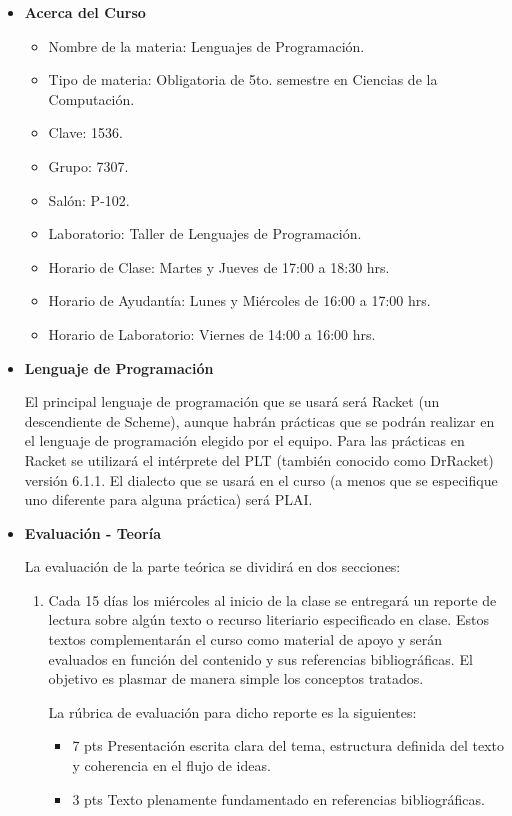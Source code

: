 \documentclass[10pt]{article}
\begin{document}
\begin{itemize}
\item \textbf{Acerca del Curso}
  
  \begin{itemize}
  \item  Nombre de la materia: Lenguajes de Programación.
  \item Tipo de materia: Obligatoria de 5to. semestre en Ciencias de
    la Computación.
  \item Clave: 1536.
  \item Grupo: 7307.
  \item Salón: P-102.
  \item Laboratorio: Taller de Lenguajes de Programación.
  \item Horario de Clase: Martes y Jueves de 17:00 a 18:30 hrs.
  \item Horario de Ayudantía: Lunes y Miércoles de 16:00 a 17:00 hrs.
  \item Horario de Laboratorio: Viernes de 14:00 a 16:00 hrs.
  \end{itemize}

\item \textbf{Lenguaje de Programación}

El principal lenguaje de programación que se usará será Racket (un
descendiente de Scheme), aunque habrán prácticas que se podrán realizar en el lenguaje
de programación elegido por el equipo. Para las prácticas en Racket se utilizará el
intérprete del PLT (también conocido como DrRacket) versión 6.1.1. El dialecto que se
usará en el curso (a menos que se especifique uno diferente para alguna práctica)
será PLAI.

\item \textbf{Evaluación - Teoría}
  
  La evaluación de la parte teórica se dividirá en dos secciones:

  \begin{enumerate}
  \item Cada 15 días los miércoles al inicio de la clase se entregará un reporte de lectura sobre algún texto o recurso literiario especificado en clase. Estos textos complementarán el curso como material de apoyo y serán evaluados en función del contenido y sus referencias bibliográficas. El objetivo es plasmar de manera simple los conceptos tratados.

    La rúbrica de evaluación para dicho reporte es la siguientes:

    \begin{itemize}
    \item 7 pts Presentación escrita clara del tema, estructura definida del texto y coherencia en el flujo de ideas.
    \item 3 pts Texto plenamente fundamentado en referencias bibliográficas. 
    \end{itemize}


\end{enumerate}
\end{itemize}
\end{document}
